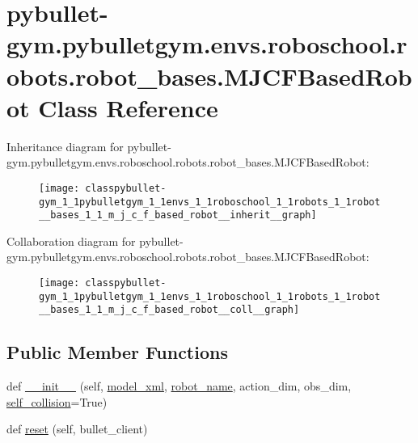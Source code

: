 \hypertarget{classpybullet-gym_1_1pybulletgym_1_1envs_1_1roboschool_1_1robots_1_1robot__bases_1_1_m_j_c_f_based_robot}{}\section{pybullet-\/gym.pybulletgym.\+envs.\+roboschool.\+robots.\+robot\+\_\+bases.\+M\+J\+C\+F\+Based\+Robot Class Reference}
\label{classpybullet-gym_1_1pybulletgym_1_1envs_1_1roboschool_1_1robots_1_1robot__bases_1_1_m_j_c_f_based_robot}


Inheritance diagram for pybullet-\/gym.pybulletgym.\+envs.\+roboschool.\+robots.\+robot\+\_\+bases.\+M\+J\+C\+F\+Based\+Robot\+:
\nopagebreak
\begin{figure}[H]
\begin{center}
\leavevmode
\texttt{[image: classpybullet-gym\_1\_1pybulletgym\_1\_1envs\_1\_1roboschool\_1\_1robots\_1\_1robot\_\_bases\_1\_1\_m\_j\_c\_f\_based\_robot\_\_inherit\_\_graph]}
\end{center}
\end{figure}


Collaboration diagram for pybullet-\/gym.pybulletgym.\+envs.\+roboschool.\+robots.\+robot\+\_\+bases.\+M\+J\+C\+F\+Based\+Robot\+:
\nopagebreak
\begin{figure}[H]
\begin{center}
\leavevmode
\texttt{[image: classpybullet-gym\_1\_1pybulletgym\_1\_1envs\_1\_1roboschool\_1\_1robots\_1\_1robot\_\_bases\_1\_1\_m\_j\_c\_f\_based\_robot\_\_coll\_\_graph]}
\end{center}
\end{figure}
\subsection*{Public Member Functions}
\begin{DoxyCompactItemize}
\item 
def \hyperlink{classpybullet-gym_1_1pybulletgym_1_1envs_1_1roboschool_1_1robots_1_1robot__bases_1_1_m_j_c_f_based_robot_ad17cd9f0de634630c99a35fc6fb7705a}{\+\_\+\+\_\+init\+\_\+\+\_\+} (self, \hyperlink{classpybullet-gym_1_1pybulletgym_1_1envs_1_1roboschool_1_1robots_1_1robot__bases_1_1_m_j_c_f_based_robot_a11643c59de09c51259063b96d99d1d41}{model\+\_\+xml}, \hyperlink{classpybullet-gym_1_1pybulletgym_1_1envs_1_1roboschool_1_1robots_1_1robot__bases_1_1_xml_based_robot_a27a9dfbfbfd4f3478cc4ea4ace80af97}{robot\+\_\+name}, action\+\_\+dim, obs\+\_\+dim, \hyperlink{classpybullet-gym_1_1pybulletgym_1_1envs_1_1roboschool_1_1robots_1_1robot__bases_1_1_xml_based_robot_ab6ba95cc9efcb674bb70711d09755b02}{self\+\_\+collision}=True)
\item 
def \hyperlink{classpybullet-gym_1_1pybulletgym_1_1envs_1_1roboschool_1_1robots_1_1robot__bases_1_1_m_j_c_f_based_robot_a837602464d54cbc7df5e316f0afabb85}{reset} (self, bullet\+\_\+client)
\end{DoxyCompactItemize}
